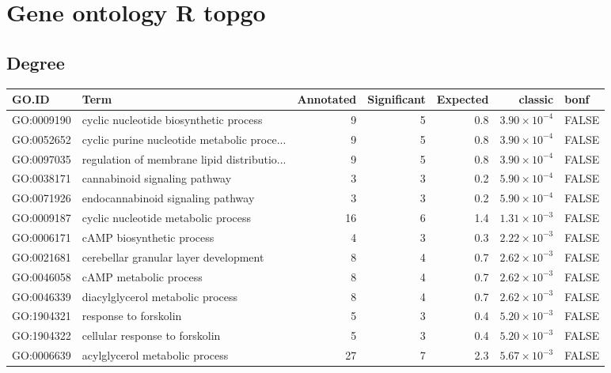\section{Gene ontology R topgo}
\subsection{Degree}

\begin{table}[ht]
\centering
\begin{adjustbox}{max width=\textwidth}
\begin{tabular}{llrrrrl}
  \hline
GO.ID & Term & Annotated & Significant & Expected & classic & bonf \\ 
  \hline
GO:0009190 & cyclic nucleotide biosynthetic process & 9 & 5 & 0.8 & $3.90 \times 10^{-4}$ & FALSE \\ 
  GO:0052652 & cyclic purine nucleotide metabolic proce... & 9 & 5 & 0.8 & $3.90 \times 10^{-4}$ & FALSE \\ 
  GO:0097035 & regulation of membrane lipid distributio... & 9 & 5 & 0.8 & $3.90 \times 10^{-4}$ & FALSE \\ 
  GO:0038171 & cannabinoid signaling pathway & 3 & 3 & 0.2 & $5.90 \times 10^{-4}$ & FALSE \\ 
  GO:0071926 & endocannabinoid signaling pathway & 3 & 3 & 0.2 & $5.90 \times 10^{-4}$ & FALSE \\ 
  GO:0009187 & cyclic nucleotide metabolic process & 16 & 6 & 1.4 & $1.31 \times 10^{-3}$ & FALSE \\ 
  GO:0006171 & cAMP biosynthetic process & 4 & 3 & 0.3 & $2.22 \times 10^{-3}$ & FALSE \\ 
  GO:0021681 & cerebellar granular layer development & 8 & 4 & 0.7 & $2.62 \times 10^{-3}$ & FALSE \\ 
  GO:0046058 & cAMP metabolic process & 8 & 4 & 0.7 & $2.62 \times 10^{-3}$ & FALSE \\ 
  GO:0046339 & diacylglycerol metabolic process & 8 & 4 & 0.7 & $2.62 \times 10^{-3}$ & FALSE \\ 
  GO:1904321 & response to forskolin & 5 & 3 & 0.4 & $5.20 \times 10^{-3}$ & FALSE \\ 
  GO:1904322 & cellular response to forskolin & 5 & 3 & 0.4 & $5.20 \times 10^{-3}$ & FALSE \\ 
  GO:0006639 & acylglycerol metabolic process & 27 & 7 & 2.3 & $5.67 \times 10^{-3}$ & FALSE \\ 

\end{tabular}
\end{adjustbox}
\end{table}
